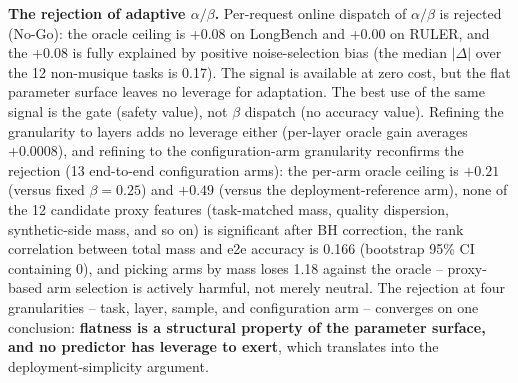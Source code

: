\documentclass[11pt]{article}
\begin{document}
\textbf{The rejection of adaptive $\alpha/\beta$.} Per-request online dispatch of $\alpha/\beta$ is rejected (No-Go): the oracle ceiling is +0.08 on LongBench and +0.00 on RULER, and the +0.08 is fully explained by positive noise-selection bias (the median $|\Delta|$ over the 12 non-musique tasks is 0.17). The signal is available at zero cost, but the flat parameter surface leaves no leverage for adaptation. The best use of the same signal is the gate (safety value), not $\beta$ dispatch (no accuracy value). Refining the granularity to layers adds no leverage either (per-layer oracle gain averages +0.0008), and refining to the configuration-arm granularity reconfirms the rejection (13 end-to-end configuration arms): the per-arm oracle ceiling is $+0.21$ (versus fixed $\beta{=}0.25$) and $+0.49$ (versus the deployment-reference arm), none of the 12 candidate proxy features (task-matched mass, quality dispersion, synthetic-side mass, and so on) is significant after BH correction, the rank correlation between total mass and e2e accuracy is 0.166 (bootstrap 95\% CI containing 0), and picking arms by mass loses 1.18 against the oracle -- proxy-based arm selection is actively harmful, not merely neutral. The rejection at four granularities -- task, layer, sample, and configuration arm -- converges on one conclusion: \textbf{flatness is a structural property of the parameter surface, and no predictor has leverage to exert}, which translates into the deployment-simplicity argument.
\end{document}
